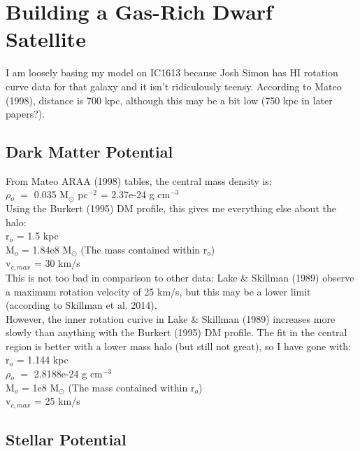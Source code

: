 \documentclass[12pt,preprint]{aastex}
\begin{document}
\section{Building a Gas-Rich Dwarf Satellite}

I am loosely basing my model on IC1613 because Josh Simon has HI rotation curve data for that galaxy and it isn't ridiculously teensy.  According to Mateo (1998), distance is 700 kpc, although this may be a bit low (750 kpc in later papers?).\\

\subsection{Dark Matter Potential}

\noindent From Mateo ARAA (1998) tables, the central mass density is:\\
\indent $\rho$$_{o}$ $=$ 0.035 M$_{\odot}$ pc$^{-2}$ = 2.37e-24 g cm$^{-3}$\\


\noindent Using the Burkert (1995) DM profile, this gives me everything else about the halo:\\
\indent r$_{o}$ = 1.5 kpc\\
\indent M$_{o}$ = 1.84e8 M$_{\odot}$ (The mass contained within r$_{o}$)\\
\indent v$_{c,max}$ = 30 km/s\\

This is not too bad in comparison to other data:  Lake \& Skillman (1989) observe a maximum rotation velocity of 25 km/s, but this may be a lower limit (according to Skillman et al. 2014).  \\

However, the inner rotation curive in Lake \& Skillman (1989) increases more slowly than anything with the Burkert (1995) DM profile.  The fit in the central region is better with a lower mass halo (but still not great), so I have gone with:\\

\indent r$_{o}$ = 1.144 kpc\\
\indent $\rho$$_{o}$ $=$ 2.8188e-24 g cm$^{-3}$\\
\indent M$_{o}$ = 1e8 M$_{\odot}$ (The mass contained within r$_{o}$)\\
\indent v$_{c,max}$ = 25 km/s\\


\subsection{Stellar Potential}
\end{document}
